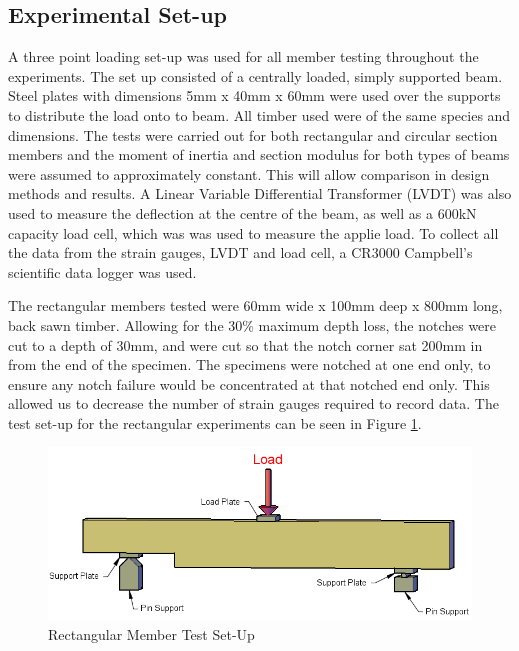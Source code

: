 \documentclass[11pt,a4paper]{article}
\numberwithin{equation}{subsection}
\begin{document}
\subsection{Experimental Set-up}
A three point loading set-up was used for all member testing throughout the experiments. The set up consisted of a centrally loaded, simply supported beam. Steel plates with dimensions 5mm x 40mm x 60mm were used over the supports to distribute the load onto to beam. All timber used were of the same species and dimensions. The tests were carried out for both rectangular and circular section members and the moment of inertia and section modulus for both types of beams were assumed to approximately constant. This will allow comparison in design methods and results. A Linear Variable Differential Transformer (LVDT) was also used to measure the deflection at the centre of the beam, as well as a 600kN capacity load cell, which was was used to measure the applie load. To collect all the data from the strain gauges, LVDT and load cell, a CR3000 Campbell's scientific data logger was used.

\vspace*{\baselineskip}

\noindent
The rectangular members tested were 60mm wide x 100mm deep x 800mm long, back sawn timber. Allowing for the 30\% maximum depth loss, the notches were cut to a depth of 30mm, and were cut so that the notch corner sat 200mm in from the end of the specimen.  The specimens were notched at one end only, to ensure any notch failure would be concentrated at that notched end only. This allowed us to decrease the number of strain gauges required to record data. The test set-up for the rectangular experiments can be seen in Figure \ref{fig:rect}.

\begin{figure}[h]
	\begin{center}
		\includegraphics[scale=0.55]{Rectangular_Set_up}
	\end{center}
	\caption{Rectangular Member Test Set-Up}
	\label{fig:rect}
\end{figure}
\end{document}
